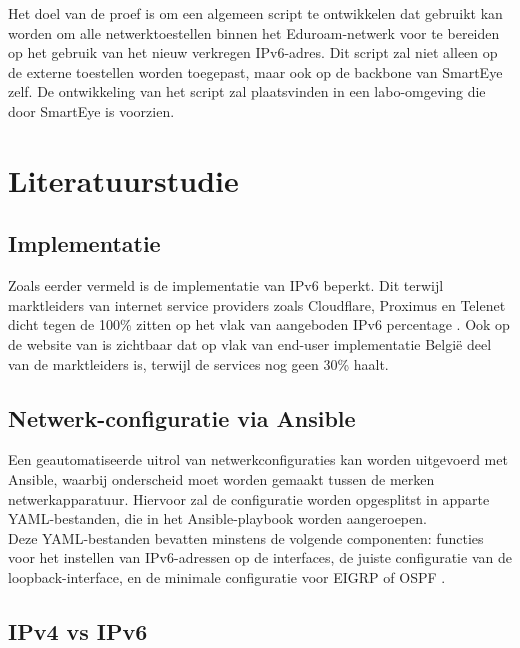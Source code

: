 Het doel van de proef is om een algemeen script te ontwikkelen dat gebruikt kan worden om alle netwerktoestellen binnen het Eduroam-netwerk voor te bereiden op het gebruik van het nieuw verkregen IPv6-adres. 
Dit script zal niet alleen op de externe toestellen worden toegepast, maar ook op de backbone van SmartEye zelf. 
De ontwikkeling van het script zal plaatsvinden in een labo-omgeving die door SmartEye is voorzien.


\section{Literatuurstudie}%
\label{sec:literatuurstudie}

\subsection{Implementatie}
\label{sec:implementatie}

Zoals eerder vermeld is de implementatie van IPv6 beperkt. 
Dit terwijl marktleiders van internet service providers zoals Cloudflare, Proximus en Telenet dicht tegen de 100\% zitten op het vlak van aangeboden IPv6 percentage \autocite{Test2024}. 
Ook op de website van \textcite{EuropeanCommission} is zichtbaar dat op vlak van end-user implementatie België deel van de marktleiders is, terwijl de services nog geen 30\% haalt.

\subsection{Netwerk-configuratie via Ansible}
\label{sec:netconfigAnsible}

Een geautomatiseerde uitrol van netwerkconfiguraties kan worden uitgevoerd met Ansible, waarbij onderscheid moet worden gemaakt tussen de merken netwerkapparatuur. 
Hiervoor zal de configuratie worden opgesplitst in apparte YAML-bestanden, die in het Ansible-playbook worden aangeroepen.\\
Deze YAML-bestanden bevatten minstens de volgende componenten: functies voor het instellen van IPv6-adressen op de interfaces, 
de juiste configuratie van de loopback-interface, en de minimale configuratie voor EIGRP of OSPF \autocite{MohdFuziMohdFaris2021}.

\subsection{IPv4 vs IPv6}
\label{sec:IPv4vsIPv6}


